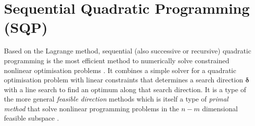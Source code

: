 \documentclass[11pt,a4paper]{report}
\renewcommand{\vec}[1]{\boldsymbol{#1}}
\begin{document}
\section{Sequential Quadratic Programming (SQP)}
\label{sec:SQP}
Based on the Lagrange method, sequential (also successive or recursive)
quadratic programming is the most efficient method to numerically solve
constrained nonlinear optimisation problems \cite{Schittkowski1980}. It
combines a simple solver for a quadratic optimisation problem with linear
constraints that determines a search direction $\vec{\delta}$ with a line
search to find an optimum along that search direction. It is a type of the
more general {\it feasible direction} methods which is itself a type of {\it
  primal method} that solve nonlinear programming problems in the $n-m$
dimensional feasible subspace \cite{Luenberger2008}.

\end{document}
